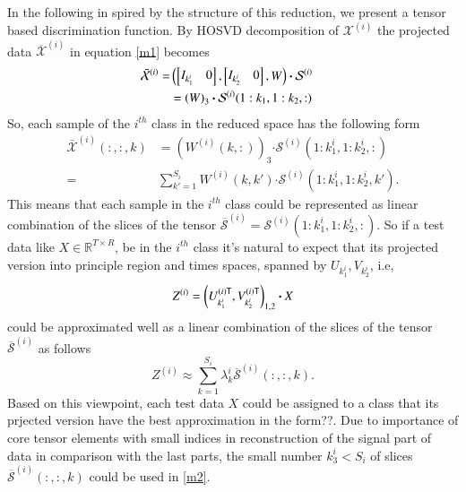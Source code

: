 \documentclass[preprint,12pt]{elsarticle}
\begin{document}
In the following  in spired by the structure of this reduction, we present a tensor based discrimination function.
By HOSVD decomposition of
$\mathcal{X}^{(i)}$ the projected data $\overline{\mathcal{X}}^{(i)}$ in equation \eqref{m1} becomes
\begin{align}
\bar{\mathcal{X}}^{(i)}= & \notag
\left(
\begin{bmatrix}
I_{k_1^i} &  0
\end{bmatrix},
\begin{bmatrix}
I_{k_2^i} &  0
\end{bmatrix},
W
\right)\boldsymbol{\cdot} \mathcal{S}^{(i)} \notag
\\&=\left( 
W
\right)_{3} \boldsymbol{\cdot} \mathcal{S}^{(i)}(1:k_1, 1:k_2, :) \notag &
\end{align}
So,  each sample of the $i^{th}$ class in the reduced space has the following form
\begin{align*}
\bar{{\mathcal{X}}}^{(i)}(:,:,k) &= \left(  
W^{(i)}(k,:)
\right)_{3} \boldsymbol{\cdot} \mathcal{S}^{(i)}(1:k_1^i, 1:k_2^i, :)\\
=& \sum_{k' = 1}^{S_i} W^{(i)}(k,k') \boldsymbol{\cdot} \mathcal{S}^{(i)}(1:k_1^i, 1:k_2^i, k').
\end{align*}
This means that each sample in the $i^{th}$ class could be represented as linear combination of the slices  of the tensor $\overline{\mathcal{S}}^{(i)}=\mathcal{S}^{(i)}(1:k_1^i, 1:k_2^i, :)$.
So if a test data like $X\in \mathbb{R}^{T\times R}$, be in the $i^{th}$ class
it's natural to expect that its
projected version into principle region and times spaces, spanned by $U_{k_1^i},V_{k_2^i}$, i.e,
\[
Z^{(i)}= \left( U_{k_1^i}^{(i)\sf T}, V_{k_2^i}^{(i)\sf T} 
\right)_{1,2}\boldsymbol{\cdot} X
\]
could be approximated well as a linear combination of the slices of the tensor $\overline{\mathcal{S}}^{(i)}$ as follows
\begin{equation}
\label{m2}
Z^{(i)} \approx \sum_{k=1}^{S_i} \lambda_k^i \overline{\mathcal{S}}^{(i)}(:,:,k).
\end{equation}
Based on this viewpoint, each test data $X$ could be assigned to a class that its prjected version have the best approximation in the form??. 
Due to importance of core tensor elements with small indices in reconstruction of the signal part of data in comparison with the last parts,
the small number $k_3^i< S_i$  of slices $\overline{\mathcal{S}}^{(i)}(:,:,k)$ could be used  in  \eqref{m2}. 
\end{document}
